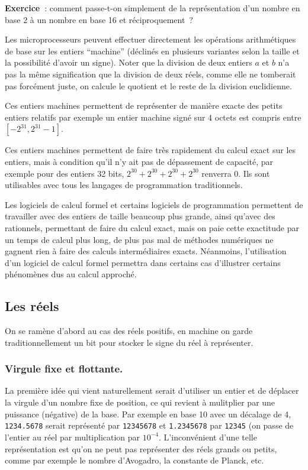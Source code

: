 \documentclass[a4paper,11pt]{article}
\begin{document}
{\bf Exercice~}: 
comment passe-t-on simplement de la représentation d'un nombre en
base 2 à un nombre en base 16 et réciproquement~?

Les microprocesseurs peuvent effectuer directement
les opérations arithmétiques de base sur les entiers ``machine''
(d\'eclin\'es en plusieurs variantes selon la taille et la
possibilit\'e d'avoir un signe). Noter que la division de deux
entiers $a$ et $b$ n'a pas la même signification que la division de deux
réels, comme elle ne tomberait pas forcément juste, 
on calcule le quotient et le reste de la division euclidienne. 

Ces entiers machines permettent
de représenter de manière exacte des petits entiers relatifs 
par exemple un entier machine sign\'e sur 4 octets est
compris entre $[-2^{31},2^{31}-1]$. 

Ces entiers machines permettent de faire très rapidement
du calcul exact sur les
entiers, mais \`a condition qu'il n'y ait pas de d\'epassement
de capacit\'e, par exemple pour des entiers 32 bits, $2^{30}+2^{30}+2^{30}+2^{30}$
renverra 0. Ils sont utilisables avec tous les langages de
programmation traditionnels.

Les logiciels de calcul formel et certains logiciels
de programmation permettent de travailler avec
des entiers de taille beaucoup plus grande, ainsi qu'avec des
rationnels, permettant de faire du calcul exact, mais on paie
cette exactitude par un temps de calcul plus long, de plus
pas mal de m\'ethodes num\'eriques ne gagnent rien \`a
faire des calculs interm\'ediaires exacts. N\'eanmoins, l'utilisation
d'un logiciel de calcul formel permettra dans certains cas d'illustrer
certains ph\'enom\`enes dus au calcul approch\'e.

\subsection{Les r\'eels}
On se ram\`ene d'abord au cas des r\'eels positifs, en machine
on garde traditionnellement un bit pour stocker le signe du r\'eel
\`a repr\'esenter.

\subsubsection{Virgule fixe et flottante.}
La premi\`ere id\'ee qui vient naturellement serait d'utiliser
un entier et de d\'eplacer la virgule
d'un nombre fixe de position, ce qui revient \`a mulitplier
par une puissance (n\'egative) de la base. Par exemple en base 10 avec un
d\'ecalage de 4, \verb|1234.5678|
serait repr\'esent\'e par \verb|12345678| et \verb|1.2345678| par
\verb|12345| (on passe de l'entier au r\'eel par multiplication
par $10^{-4}$. L'inconv\'enient d'une telle repr\'esentation est
qu'on ne peut pas repr\'esenter des r\'eels grands ou petits,
comme par exemple le nombre d'Avogadro, la constante de Planck, etc.
\end{document}
